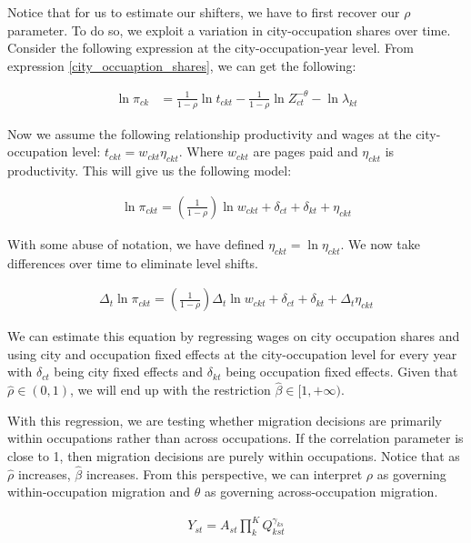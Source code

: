 \documentclass[10pt]{article}
\begin{document}
Notice that for us to estimate our shifters, we have to first recover our $\rho$ parameter. To do so, we exploit a variation in city-occupation shares over time. Consider the following expression at the city-occupation-year level. From expression \ref{city_occuaption_shares}, we can get the following:

\begin{align*}
    \ln \pi_{ck} & = \frac{1}{1 - \rho} \ln t_{ckt} - \frac{1}{1 - \rho} \ln Z_{ct}^{- \theta} - \ln \lambda_{kt}
\end{align*}

Now we assume the following relationship productivity and wages at the city-occupation level: $t_{ckt} = w_{ckt} \eta_{ckt}$. Where $w_{ckt}$ are pages paid and $\eta_{ckt}$ is productivity. This will give us the following model:

\begin{align*}
    \ln \pi_{ckt} = \left( \frac{1}{1 - \rho} \right) \ln w_{ckt} + \delta_{ct} + \delta_{kt} + \eta_{ckt}
\end{align*}

With some abuse of notation, we have defined $\eta_{ckt} = \ln \eta_{ckt}$. We now take differences over time to eliminate level shifts.

\begin{align*}
    \Delta_t \ln \pi_{ckt} = \left( \frac{1}{1 - \rho} \right) \Delta_t \ln w_{ckt} + \delta_{ct} + \delta_{kt} + \Delta_t \eta_{ckt}
\end{align*}

We can estimate this equation by regressing wages on city occupation shares and using city and occupation fixed effects at the city-occupation level for every year with $\delta_{ct}$ being city fixed effects and $\delta_{kt}$ being occupation fixed effects. Given that $\hat{\rho} \in (0, 1)$, we will end up with the restriction $\hat{\beta} \in [1, +\infty)$.

With this regression, we are testing whether migration decisions are primarily within occupations rather than across occupations. If the correlation parameter is close to 1, then migration decisions are purely within occupations. Notice that as $\hat{\rho}$ increases, $\hat{\beta}$ increases. From this perspective, we can interpret $\rho$ as governing within-occupation migration and $\theta$ as governing across-occupation migration.

\begin{align*}
    Y_{st} = A_{st} \prod_{k}^{K} Q_{kst}^{\gamma_{ks}}
\end{align*}
\end{document}
